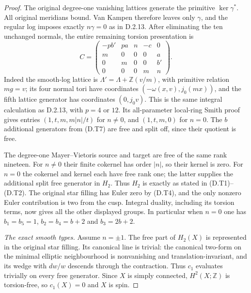 \begin{proof}
The original degree-one vanishing lattices generate the
primitive $\ker\gamma^*$. All original meridians bound.
Van Kampen therefore leaves only $\gamma$, and the regular
log imposes exactly $n\gamma=0$ as in D.2.13.
After eliminating the ten unchanged normals, the entire
remaining torsion presentation is
\[
 C=\begin{pmatrix}
 -pb'&pa&n&-c&0\\
 m&0&0&0&a\\
 0&m&0&0&b'\\
 0&0&0&m&n
 \end{pmatrix}.
 \tag{D.T10}
\]
Indeed the smooth-log lattice is
$\Lambda'=\Lambda+\mathbb Z(v/m)$, with primitive relation
$mg=v$; its four normal tori have coordinates
$(-\omega(x,v),j_0(mx))$, and the fifth lattice generator
has coordinates $(0,j_0v)$. This is the same integral
calculation as D.2.13, with $p=4$ or $12$.
Its all-parameter local-ring Smith proof gives entries
$(1,t,m,m|n|/t)$ for $n\ne0$, and $(1,t,m,0)$ for $n=0$.
The $b$ additional generators from (D.T7) are free and
split off, since their quotient is free.

The degree-one Mayer--Vietoris source and target are free
of the same rank nineteen. For $n\ne0$ their finite cokernel
has order $|n|$, so their kernel is zero. For $n=0$ the
cokernel and kernel each have free rank one; the latter
supplies the additional split free generator in $H_2$.
Thus $H_2$ is exactly as stated in (D.T1)--(D.T2).
The original star filling has Euler zero by (D.T4), and
the only nonzero Euler contribution is two from the cusp.
Integral duality, including its torsion terms, now gives
all the other displayed groups. In particular when $n=0$
one has $b_1=b_5=1$, $b_2=b_4=b+2$ and $b_3=2b+2$.

\emph{The exact smooth types.}
Assume $n=\pm1$. The free part of $H_2(X)$ is represented
in the original star filling. Its canonical line is trivial:
the canonical two-form on the minimal elliptic neighbourhood
is nonvanishing and translation-invariant, and its wedge
with $dw/w$ descends through the contraction. Thus $c_1$
evaluates trivially on every free generator. Since $X$ is
simply connected, $H^2(X;\mathbb Z)$ is torsion-free, so
$c_1(X)=0$ and $X$ is spin.


\end{proof}
